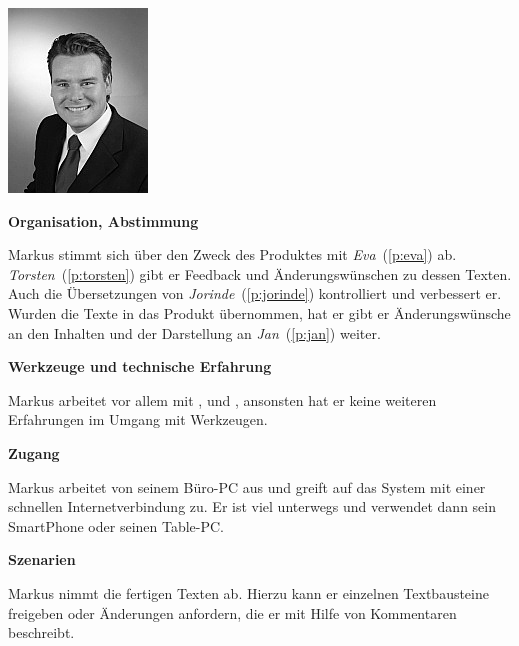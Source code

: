 \begin{multicols}{2}

\begin{center}
\includegraphics[width=0.5\columnwidth]{media/markus.jpg}
\end{center}


\textbf{Organisation, Abstimmung}

Markus stimmt sich über den Zweck des Produktes mit \emph{Eva}~(\ref{p:eva}) ab. \emph{Torsten}~(\ref{p:torsten}) gibt er Feedback und Änderungswünschen zu dessen Texten. Auch die Übersetzungen von \emph{Jorinde}~(\ref{p:jorinde}) kontrolliert und verbessert er. Wurden die Texte in das Produkt übernommen, hat er gibt er Änderungswünsche an den Inhalten und der Darstellung an \emph{Jan}~(\ref{p:jan}) weiter.

\textbf{Werkzeuge und technische Erfahrung}

Markus arbeitet vor allem mit ,  und , ansonsten hat er keine weiteren Erfahrungen im Umgang mit Werkzeugen.

\textbf{Zugang}

Markus arbeitet von seinem Büro-PC aus und greift auf das System mit einer schnellen Internetverbindung zu. Er ist viel unterwegs und verwendet dann sein SmartPhone oder seinen Table-PC.

\columnbreak

\textbf{Szenarien}

Markus nimmt die fertigen Texten ab. Hierzu kann er einzelnen Textbausteine freigeben oder Änderungen anfordern, die er mit Hilfe von Kommentaren beschreibt. 


\end{multicols}
